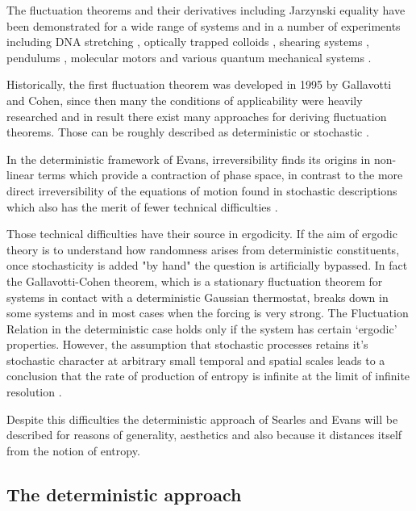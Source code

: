 \documentclass[a4paper,12pt]{article}
\begin{document}
The fluctuation theorems and their derivatives including Jarzynski equality have been demonstrated for a wide range of systems and in a number of experiments including DNA stretching \cite{Collin:2005fx}, optically trapped colloids \cite{Carberry:2007be}, shearing systems \cite{Evans:1993bl}, pendulums \cite{Ciliberto:2010jg}, molecular motors \cite{Seifert:2005it} and various quantum mechanical systems \cite{Monnai:2005ke}.

Historically, the first fluctuation theorem was developed in 1995 by Gallavotti and Cohen\cite{Gallavotti:1995gy}, since then many the conditions of applicability were heavily researched and in result there exist many approaches for deriving fluctuation theorems. 
Those can be roughly described as deterministic \cite{Evans:2002gg}\cite{Evans:2241458} or stochastic \cite{Kurchan:1998}.

In the deterministic framework of Evans, irreversibility finds its origins in non-linear terms which provide a contraction of phase space, in contrast to the more direct irreversibility of the equations of motion found in stochastic descriptions which also has the merit of fewer technical difficulties \cite{Crooks:2008ta}. 

Those technical difficulties have their source in ergodicity. If the aim of ergodic theory is to understand how randomness arises from deterministic constituents, once stochasticity is added "by hand" the question is artificially bypassed.
In fact the Gallavotti-Cohen theorem, which is a stationary fluctuation theorem for systems in contact with a deterministic Gaussian thermostat, breaks down in some systems and in most cases when the forcing is very strong. The Fluctuation Relation in the deterministic case holds only if the system has certain ‘ergodic’ properties\cite{Kurchan:2009ub}. 
However, the assumption that stochastic processes retains it's stochastic character at arbitrary small temporal and spatial scales leads to a conclusion that the rate of production of entropy is infinite at the limit of infinite resolution \cite{Dorfman:ozm67-zD}.

Despite this difficulties the deterministic approach of Searles and Evans will be described for reasons of generality, aesthetics and also because it distances itself from the notion of entropy.

\subsection{The deterministic approach}
\end{document}
